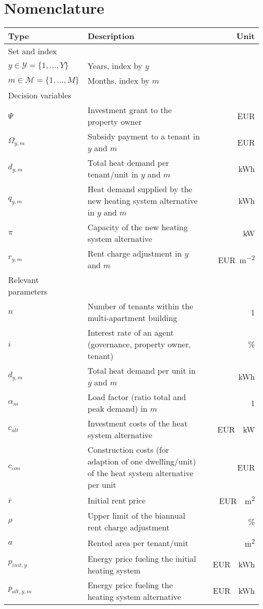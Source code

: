 \documentclass[review]{elsarticle}
\begin{document}
\section*{Nomenclature}
\begin{center}
	\renewcommand{\arraystretch}{1.1}
	\centering
	\small
	\begin{tabular}{lm{8cm}r}
		Type & Description & Unit\\
		\hline
		Set and index & & \\
		\hline
		
		{$y \in \mathcal{Y}=\{1,\ldots,Y\}$} & Years, index by $y$\\
		{$m \in \mathcal{M}=\{1,\ldots,M\}$} & Months, index by $m$\\
		\hline
		Decision variables\\
		\hline
		{$\Psi$} & Investment grant to the property owner & \SI{}{EUR}\\
		{$\Omega_{y,m}$} & Subsidy payment to a tenant in $y$ and $m$ & \SI{}{EUR}\\
		{$d_{y,m}$} & Total heat demand per tenant/unit in $y$ and $m$& \SI{}{kWh}\\
		{$q_{y,m}$} & Heat demand supplied by the new heating system alternative in $y$ and $m$& \SI{}{kWh}\\
		{$\pi$} & Capacity of the new heating system alternative & \SI{}{kW}\\
		{$r_{y,m}$} & Rent charge adjustment in $y$ and $m$ & \SI{}{EUR\per m^2}\\
		\hline
		Relevant parameters\\
		\hline
		{$n$} & Number of tenants within the multi-apartment building & \SI{}{1}\\
		{$i$} & Interest rate of an agent (governance, property owner, tenant)& \SI{}{\%}\\
		{$d_{y,m}$} & Total heat demand per unit in $y$ and $m$ & \SI{}{kWh}\\
		{$\alpha_{m}$} & Load factor (ratio total and peak demand) in $m$ & \SI{}{1}\\
		{$c_{alt}$} & Investment costs of the heat system alternative& \SI{}{EUR \per kW}\\
		{$c_{con}$} & Construction costs (for adaption of one dwelling/unit) of the heat system alternative per unit & \SI{}{EUR}\\
		{$\bar{r}$} & Initial rent price & \SI{}{EUR \per m^2}\\
		{$\rho$} & Upper limit of the biannual rent charge adjustment & \SI{}{\%}\\
		{$a$} & Rented area per tenant/unit & \SI{}{m^2}\\
		{$p_{init,y}$} & Energy price fueling the initial heating system & \SI{}{EUR \per kWh}\\
		{$p_{alt,y,m}$} & Energy price fueling the heating system alternative & \SI{}{EUR \per kWh}\\
		\hline
	\end{tabular}
\end{center}
\newpage
\end{document}
